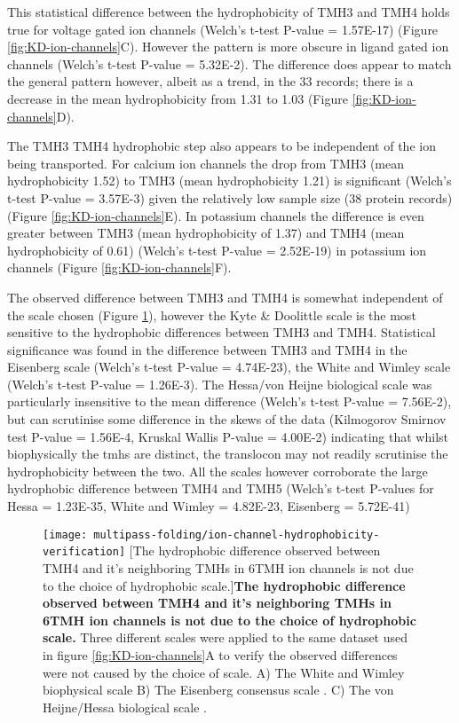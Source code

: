 This statistical difference between the hydrophobicity of TMH3 and TMH4 holds true for voltage gated ion channels (Welch's t\--test P\--value = 1.57E-17) (Figure \ref{fig:KD-ion-channels}C).
However the pattern is more obscure in ligand gated ion channels (Welch's t\--test P\--value = 5.32E-2).
The difference does appear to match the general pattern however, albeit as a trend, in the 33 records; there is a decrease in the mean hydrophobicity from 1.31 to 1.03 (Figure \ref{fig:KD-ion-channels}D).

 The TMH3 TMH4 hydrophobic step also appears to be independent of the ion being transported.
 For calcium ion channels the drop from TMH3 (mean hydrophobicity 1.52) to TMH3 (mean hydrophobicity 1.21) is significant (Welch's t\--test P\--value = 3.57E-3) given the relatively low sample size (38 protein records) (Figure \ref{fig:KD-ion-channels}E).
In potassium channels the difference is even greater between TMH3 (mean hydrophobicity of 1.37) and TMH4 (mean hydrophobicity of 0.61) (Welch's t\--test P\--value = 2.52E-19) in potassium ion channels (Figure \ref{fig:KD-ion-channels}F).

The observed difference between TMH3 and TMH4 is somewhat independent of the scale chosen (Figure \ref{fig:ion-channel-hydrophobicity-verification}), however the Kyte \& Doolittle scale is the most sensitive to the hydrophobic differences between TMH3 and TMH4.
Statistical significance was found in the difference between TMH3 and TMH4 in the Eisenberg scale (Welch's t\--test P\--value = 4.74E-23), the White and Wimley scale (Welch's t\--test P\--value = 1.26E-3).
The Hessa/von Heijne biological scale was particularly insensitive to the mean difference (Welch's t\--test P\--value = 7.56E-2), but can scrutinise some difference in the skews of the data (Kilmogorov Smirnov test  P\--value = 1.56E-4, Kruskal Wallis P\--value = 4.00E-2) indicating that whilst biophysically the \gls{tmh}s are distinct, the translocon may not readily scrutinise the hydrophobicity between the two.
All the scales however corroborate the large hydrophobic difference between TMH4 and TMH5 (Welch's t\--test P\--values for Hessa = 1.23E-35, White and Wimley = 4.82E-23, Eisenberg = 5.72E-41)

\begin{figure}[!ht]
\centering
\texttt{[image: multipass-folding/ion-channel-hydrophobicity-verification]}
  [The hydrophobic difference observed between TMH4 and it's neighboring TMHs in 6TMH ion channels is not due to the choice of hydrophobic scale.]{\textbf{The hydrophobic difference observed between TMH4 and it's neighboring TMHs in 6TMH ion channels is not due to the choice of hydrophobic scale.}
  Three different scales were applied to the same dataset used in figure \ref{fig:KD-ion-channels}A to verify the observed differences were not caused by the choice of scale.
  A) The White and Wimley biophysical scale \cite{White1999}
  B) The Eisenberg consensus scale \cite{Eisenberg1984}.
  C) The von Heijne/Hessa biological scale \cite{Hessa2005}.}

\label{fig:ion-channel-hydrophobicity-verification}
\end{figure}

